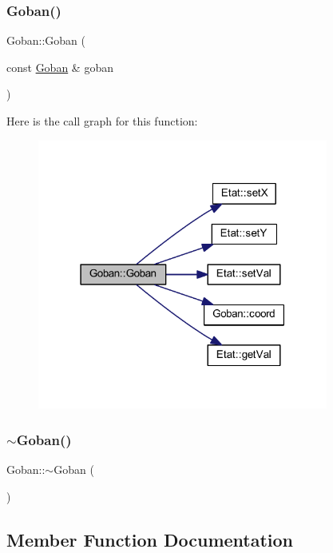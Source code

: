 \subsubsection{\texorpdfstring{Goban()}{Goban()}\hspace{0.1cm}{\footnotesize\ttfamily [2/2]}}
{\footnotesize\ttfamily Goban\+::\+Goban (\begin{DoxyParamCaption}\item[{const \hyperlink{class_goban}{Goban} \&}]{goban }\end{DoxyParamCaption})}

Here is the call graph for this function\+:
\nopagebreak
\begin{figure}[H]
\begin{center}
\leavevmode
\includegraphics[width=271pt]{class_goban_a8c49da36e406f11d33671a4c8a4c19b2_cgraph}
\end{center}
\end{figure}
\mbox{\label{class_goban_a5b994de02310a29128749d8ea47ea0ab}} 
\subsubsection{\texorpdfstring{$\sim$\+Goban()}{~Goban()}}
{\footnotesize\ttfamily Goban\+::$\sim$\+Goban (\begin{DoxyParamCaption}{ }\end{DoxyParamCaption})}



\subsection{Member Function Documentation}
\mbox{\label{class_goban_aefd43ab2cf0746f2f8c653d825bf080c}} 
